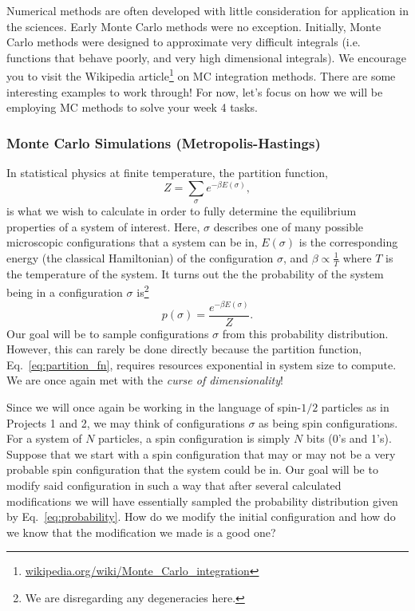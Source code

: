 \documentclass[12pt]{article}
\begin{document}
Numerical methods are often developed with little consideration for application in the sciences. Early Monte Carlo methods were no exception. Initially, Monte Carlo methods were designed to approximate very difficult integrals (i.e. functions that behave poorly, and very high dimensional integrals). We encourage you to visit the Wikipedia article\footnote{\href{http://en.wikipedia.org/wiki/Monte\_Carlo\_integration}{wikipedia.org/wiki/Monte\_Carlo\_integration}} on MC integration methods. There are some interesting examples to work through! For now, let's focus on how we will be employing MC methods to solve your week 4 tasks. 

\subsubsection{Monte Carlo Simulations (Metropolis-Hastings)}

In statistical physics at finite temperature, the partition function, 
\begin{equation} \label{eq:partition_fn}
    Z = \sum_{\sigma} e^{-\beta E(\sigma)},
\end{equation}
is what we wish to calculate in order to fully determine the equilibrium properties of a system of interest. Here, $\sigma$ describes one of many possible microscopic configurations that a system can be in, $E(\sigma)$ is the corresponding energy (the classical Hamiltonian)
of the configuration $\sigma$, and $\beta \propto \frac{1}{T}$ where $T$ is the temperature of the system. It turns out the the probability of the system being in a configuration $\sigma$ is\footnote{We are disregarding any degeneracies here.}
\begin{equation} \label{eq:probability}
    p(\sigma) = \frac{e^{-\beta E(\sigma)}}{Z}.
\end{equation}
Our goal will be to sample configurations $\sigma$ from this probability distribution. However, this can rarely be done directly because the partition function, Eq.~\eqref{eq:partition_fn}, requires resources exponential in system size to compute. We are once again met with the {\it curse of dimensionality}!

Since we will once again be working in the language of spin-$1/2$ particles as in Projects 1 and 2, we may think of configurations $\sigma$ as being spin configurations. For a system of $N$ particles, a spin configuration is simply $N$ bits (0's and 1's). Suppose that we start with a spin configuration that may or may not be a very probable spin configuration that the system could be in. Our goal will be to modify said configuration in such a way that after several calculated modifications we will have essentially sampled the probability distribution given by Eq.~\eqref{eq:probability}. How do we modify the initial configuration and how do we know that the modification we made is a good one?
\end{document}
